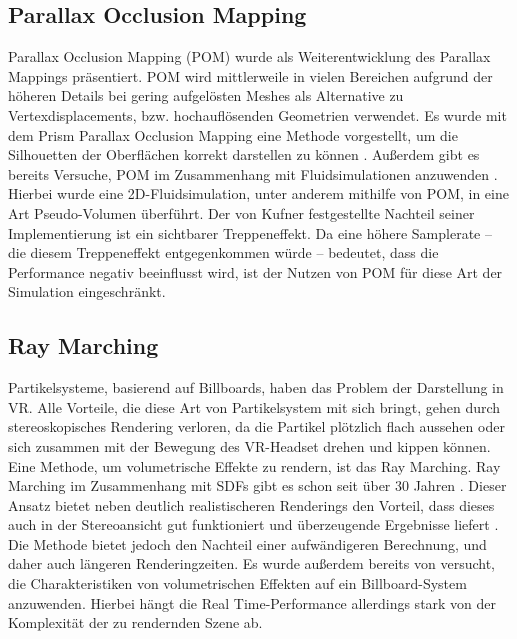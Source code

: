 \subsection{Parallax Occlusion Mapping}
Parallax Occlusion Mapping (POM) \parencite{Brawley2004} wurde als Weiterentwicklung des Parallax Mappings \parencite{Kaneko2001} präsentiert.
POM wird mittlerweile in vielen Bereichen aufgrund der höheren Details bei gering aufgelösten Meshes \parencite{Tatarchuk2006} als 
Alternative zu Vertexdisplacements, bzw. hochauflösenden Geometrien verwendet. Es wurde mit dem Prism Parallax Occlusion Mapping
eine Methode vorgestellt, um die Silhouetten der Oberflächen korrekt darstellen zu können \parencite{Dachsbacher2007}. 
Außerdem gibt es bereits Versuche, POM im Zusammenhang mit Fluidsimulationen 
anzuwenden \parencite{Kufner2017}. Hierbei wurde eine 2D-Fluidsimulation, unter anderem mithilfe von POM, in eine Art Pseudo-Volumen überführt. 
Der von Kufner festgestellte Nachteil seiner Implementierung ist ein sichtbarer Treppeneffekt. Da eine höhere Samplerate – die diesem 
Treppeneffekt entgegenkommen würde – bedeutet, dass die Performance negativ beeinflusst wird, ist der Nutzen von POM für diese 
Art der Simulation eingeschränkt.



\subsection{Ray Marching}

Partikelsysteme, basierend auf Billboards, haben das Problem der Darstellung in VR. Alle Vorteile, die diese Art von 
Partikelsystem mit sich bringt, gehen durch stereoskopisches Rendering verloren, da die Partikel plötzlich flach aussehen 
oder sich zusammen mit der Bewegung des VR-Headset drehen und kippen können.
Eine Methode, um volumetrische Effekte zu rendern, ist das Ray Marching. Ray Marching im Zusammenhang mit SDFs gibt es 
schon seit über 30 Jahren \parencite{Hart1989}.
Dieser Ansatz bietet neben deutlich realistischeren Renderings den Vorteil, dass dieses 
auch in der Stereoansicht gut funktioniert und überzeugende Ergebnisse liefert \parencite{Wald2006}. Die Methode bietet 
jedoch den Nachteil einer aufwändigeren Berechnung, und daher auch längeren Renderingzeiten. Es wurde außerdem bereits von 
\textcite{Zhang2020} versucht, die Charakteristiken von volumetrischen Effekten auf ein Billboard-System anzuwenden. 
Hierbei hängt die Real Time-Performance allerdings stark von der Komplexität der zu rendernden Szene ab.